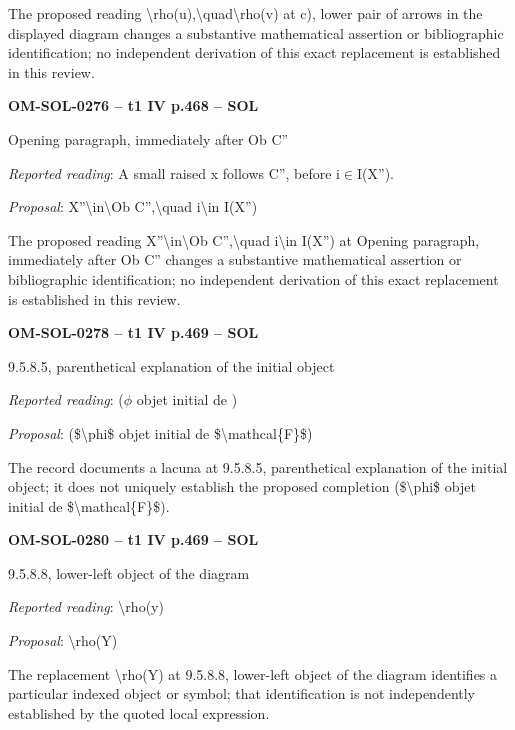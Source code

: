 The proposed reading \textbackslash{}rho(u),\textbackslash{}quad\textbackslash{}rho(v) at c), lower pair of arrows in the displayed diagram changes a substantive mathematical assertion or bibliographic identification; no independent derivation of this exact replacement is established in this review.\par
\par\noindent\textbf{OM-SOL-0276 -- t1 IV p.468 -- SOL}\par
Opening paragraph, immediately after Ob C''\par
\emph{Reported reading}: A small raised x follows C'', before i\ensuremath{\in}I(X'').\par
\emph{Proposal}: X''\textbackslash{}in\textbackslash{}Ob C'',\textbackslash{}quad i\textbackslash{}in I(X'')\par
The proposed reading X''\textbackslash{}in\textbackslash{}Ob C'',\textbackslash{}quad i\textbackslash{}in I(X'') at Opening paragraph, immediately after Ob C'' changes a substantive mathematical assertion or bibliographic identification; no independent derivation of this exact replacement is established in this review.\par
\par\noindent\textbf{OM-SOL-0278 -- t1 IV p.469 -- SOL}\par
9.5.8.5, parenthetical explanation of the initial object\par
\emph{Reported reading}: (\ensuremath{\phi} objet initial de )\par
\emph{Proposal}: (\$\textbackslash{}phi\$ objet initial de \$\textbackslash{}mathcal\{F\}\$)\par
The record documents a lacuna at 9.5.8.5, parenthetical explanation of the initial object; it does not uniquely establish the proposed completion (\$\textbackslash{}phi\$ objet initial de \$\textbackslash{}mathcal\{F\}\$).\par
\par\noindent\textbf{OM-SOL-0280 -- t1 IV p.469 -- SOL}\par
9.5.8.8, lower-left object of the diagram\par
\emph{Reported reading}: \textbackslash{}rho(y)\par
\emph{Proposal}: \textbackslash{}rho(Y)\par
The replacement \textbackslash{}rho(Y) at 9.5.8.8, lower-left object of the diagram identifies a particular indexed object or symbol; that identification is not independently established by the quoted local expression.\par
